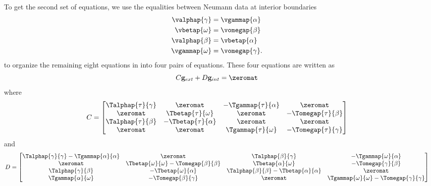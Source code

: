 To get the second set of equations, we use the equalities between Neumann data at interior boundaries
\begin{equation}
\begin{aligned}
\valphap{\gamma} & = \vgammap{\alpha} \\
\vbetap{\omega} & = \vomegap{\beta} \\
\valphap{\beta} & = \vbetap{\alpha} \\
\vgammap{\omega} & = \vomegap{\gamma}.
\end{aligned}
\end{equation}
to organize the remaining eight equations in  into four pairs of equations.  These four equations are written as
\begin{equation}
C\mathbf g_{ext} + D\mathbf g_{int} = \zeromat
\end{equation}
where
\begin{equation}
C = 
\begin{bmatrix}
\Talphap{\tau}{\gamma} & \zeromat               & -\Tgammap{\tau}{\alpha} & \zeromat \\
\zeromat               & \Tbetap{\tau}{\omega}  & \zeromat                & -\Tomegap{\tau}{\beta} \\ 
\Talphap{\tau}{\beta}  & -\Tbetap{\tau}{\alpha} & \zeromat                & \zeromat \\
\zeromat               & \zeromat               & \Tgammap{\tau}{\omega}  & -\Tomegap{\tau}{\gamma}
\end{bmatrix}
\end{equation}
and
\begin{equation}
D = \begin{bmatrix}
\Talphap{\gamma}{\gamma} - \Tgammap{\alpha}{\alpha} 
& \zeromat 
& \Talphap{\beta}{\gamma} 
& -\Tgammap{\omega}{\alpha} \\
% 
\zeromat 
& \Tbetap{\omega}{\omega} - \Tomegap{\beta}{\beta} 
& \Tbetap{\alpha}{\omega} 
& -\Tomegap{\gamma}{\beta} \\
% 
\Talphap{\gamma}{\beta} 
& -\Tbetap{\omega}{\alpha} 
& \Talphap{\beta}{\beta}- \Tbetap{\alpha}{\alpha} 
& \zeromat \\
% 
\Tgammap{\alpha}{\omega} 
& -\Tomegap{\beta}{\gamma} 
& \zeromat 
& \Tgammap{\omega}{\omega} - \Tomegap{\gamma}{\gamma}
\end{bmatrix}
\label{eq:matrix_CD}
\end{equation}

